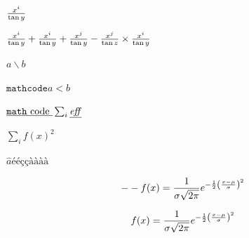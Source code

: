 \documentclass[fleqn]{minimal}
\begin{document}
\begin{preview}
${x^i}\over{\tan y}$
\end{preview}

\begin{preview}
${{x^i}\over{\tan y}} + \frac{x^i}{\tan y} + \frac{x^j}{\tan y} - \frac{x^j}{\tan z}
 \times \frac{x^i}{\tan y}$
\end{preview}

\begin{preview}
$a \backslash{} b$
\end{preview}

\begin{preview}
$\mathtt{math code} a < b$
\end{preview}

\begin{preview}
$\underline{\mathtt{math \hbox{ code }}} \sum_{i}{\underline{\mathit{eff}}}$
\end{preview}

\begin{preview}
$\sum_{i} f(x)^{2}$
\end{preview}

\begin{preview}
$\hat{a}ééççàààà$
\end{preview}

\begin{preview}

\[-- f(x) = {1 \over \sigma \sqrt{2\pi}}e^{-{1 \over 2}\left({x-\mu \over \sigma}\right)^2}
\]
\end{preview}

\begin{preview}

\[ f(x)
= {1\over\sigma\sqrt{2\pi}}
     e^{-{1\over2}\left({x-\mu\over\sigma}\right)^2}
\]
\end{preview}
\end{document}
